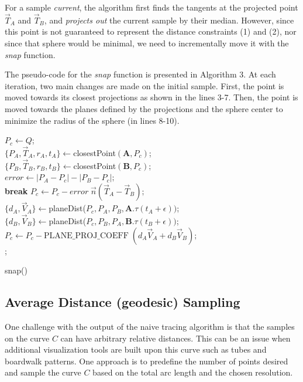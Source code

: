 \documentclass[journal, letterpaper]{IEEEtran}
\begin{document}
For a sample \textit{current}, the algorithm first finds the tangents
at the projected point $\vec{T}_A$ and $\vec{T}_B$, and \textit{projects out} the current sample by their median.
However, since this point is not guaranteed to represent the distance constraints (1) and (2), nor since that
sphere would be minimal, we need to incrementally move it with the \textit{snap} function. 

The pseudo-code for the \textit{snap} function is presented in Algorithm 3. At each iteration,
two main changes are made on the initial sample. First, the point is moved towards its closest projections
as shown in the lines 3-7. Then, the point is moved towards the planes defined by the projections 
and the sphere center to minimize the radius of the sphere (in lines 8-10).

\begin{algorithm}[ht!]
  $P_c \leftarrow Q$; \\
   {
    $\{P_A, \vec{T}_A, r_A, t_A\} \leftarrow $closestPoint$(\mathbf{A}, P_c)$;  \\
    $\{P_B, \vec{T}_B, r_B, t_B\} \leftarrow $closestPoint$(\mathbf{B}, P_c)$;  \\
    $error \leftarrow |P_A - P_c| - |P_B - P_c|;$\\ 
     {\textbf{break}}
    $P_c \leftarrow P_c - error \;\vec{n}(\vec{T}_A - \vec{T}_B);$ \\
    $\{d_A, \vec{V}_A\} \leftarrow $planeDist($P_c, P_A, P_B, \mathbf{A}.\tau(t_A + \epsilon))$;\\
    $\{d_B, \vec{V}_B\} \leftarrow $planeDist($P_c, P_B, P_A, \mathbf{B}.\tau(t_B + \epsilon))$;\\
    $P_c \leftarrow P_c - \text{PLANE\_PROJ\_COEFF} \;(d_A \vec{V}_A + d_B \vec{V}_B); $\\
  }
  ;
  \caption{snap()}
\end{algorithm}


\subsection{Average Distance (geodesic) Sampling}

One challenge with the output of the naive tracing algorithm is that the samples on the curve $C$
can have arbitrary relative distances. This can be an issue when additional visualization tools
are built upon this curve such as tubes and boardwalk patterns. One approach is to predefine
the number of points desired and sample the curve $C$ based on the total arc length and the 
chosen resolution. 
\end{document}
